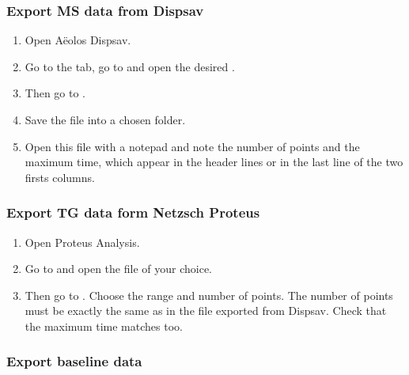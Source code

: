 \documentclass[a4paper, 11pt, raggedright, parskip, sans, colorful]{tufte-style-article}
\begin{document}
\subsubsection{Export MS data from  Dispsav}

\begin{enumerate}
	
\item Open Aëolos Dispsav.

\item Go to the  tab, go to  and open the desired .

\item Then go to . 

\item Save the  file into a chosen folder.

\item Open this  file with a notepad and note the number of points and the maximum time, which appear in the header lines or in the last line of the two firsts columns.

\end{enumerate}


\subsubsection{Export TG data form Netzsch Proteus}

\begin{enumerate}
	
\item Open Proteus Analysis.
	
\item Go to  and open the  file of your choice.

\item Then go to . Choose the range and number of points. The number of points must be exactly the same as in the  file exported from Dispsav. Check that the maximum time matches too.

\end{enumerate}


\subsubsection{Export baseline data}
\end{document}
